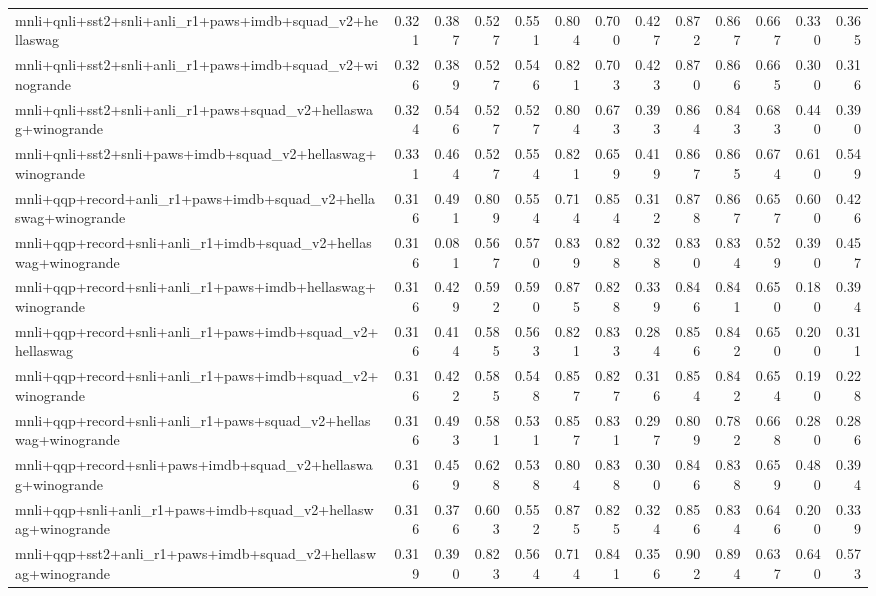\begin{table}[t]
\begin{tabular}{lrrrrrrrrrrrr}
    mnli+qnli+sst2+snli+anli\_r1+paws+imdb+squad\_v2+hellaswag & 0.321 & 0.387 & 0.527 & 0.551 & 0.804 & 0.700 & 0.427 & 0.872 & 0.867 & 0.667 & 0.330 & 0.365 \\
    mnli+qnli+sst2+snli+anli\_r1+paws+imdb+squad\_v2+winogrande & 0.326 & 0.389 & 0.527 & 0.546 & 0.821 & 0.703 & 0.423 & 0.870 & 0.866 & 0.665 & 0.300 & 0.316 \\
    mnli+qnli+sst2+snli+anli\_r1+paws+squad\_v2+hellaswag+winogrande & 0.324 & 0.546 & 0.527 & 0.527 & 0.804 & 0.673 & 0.393 & 0.864 & 0.843 & 0.683 & 0.440 & 0.390 \\
    mnli+qnli+sst2+snli+paws+imdb+squad\_v2+hellaswag+winogrande & 0.331 & 0.464 & 0.527 & 0.554 & 0.821 & 0.659 & 0.419 & 0.867 & 0.865 & 0.674 & 0.610 & 0.549 \\
    mnli+qqp+record+anli\_r1+paws+imdb+squad\_v2+hellaswag+winogrande & 0.316 & 0.491 & 0.809 & 0.554 & 0.714 & 0.854 & 0.312 & 0.878 & 0.867 & 0.657 & 0.600 & 0.426 \\
    mnli+qqp+record+snli+anli\_r1+imdb+squad\_v2+hellaswag+winogrande & 0.316 & 0.081 & 0.567 & 0.570 & 0.839 & 0.828 & 0.328 & 0.830 & 0.834 & 0.529 & 0.390 & 0.457 \\
    mnli+qqp+record+snli+anli\_r1+paws+imdb+hellaswag+winogrande & 0.316 & 0.429 & 0.592 & 0.590 & 0.875 & 0.828 & 0.339 & 0.846 & 0.841 & 0.650 & 0.180 & 0.394 \\
    mnli+qqp+record+snli+anli\_r1+paws+imdb+squad\_v2+hellaswag & 0.316 & 0.414 & 0.585 & 0.563 & 0.821 & 0.833 & 0.284 & 0.856 & 0.842 & 0.650 & 0.200 & 0.311 \\
    mnli+qqp+record+snli+anli\_r1+paws+imdb+squad\_v2+winogrande & 0.316 & 0.422 & 0.585 & 0.548 & 0.857 & 0.827 & 0.316 & 0.854 & 0.842 & 0.654 & 0.190 & 0.228 \\
    mnli+qqp+record+snli+anli\_r1+paws+squad\_v2+hellaswag+winogrande & 0.316 & 0.493 & 0.581 & 0.531 & 0.857 & 0.831 & 0.297 & 0.809 & 0.782 & 0.668 & 0.280 & 0.286 \\
    mnli+qqp+record+snli+paws+imdb+squad\_v2+hellaswag+winogrande & 0.316 & 0.459 & 0.628 & 0.538 & 0.804 & 0.838 & 0.300 & 0.846 & 0.838 & 0.659 & 0.480 & 0.394 \\
    mnli+qqp+snli+anli\_r1+paws+imdb+squad\_v2+hellaswag+winogrande & 0.316 & 0.376 & 0.603 & 0.552 & 0.875 & 0.825 & 0.324 & 0.856 & 0.834 & 0.646 & 0.200 & 0.339 \\
    mnli+qqp+sst2+anli\_r1+paws+imdb+squad\_v2+hellaswag+winogrande & 0.319 & 0.390 & 0.823 & 0.564 & 0.714 & 0.841 & 0.356 & 0.902 & 0.894 & 0.637 & 0.640 & 0.573 \\

\end{tabular}
\end{table}
